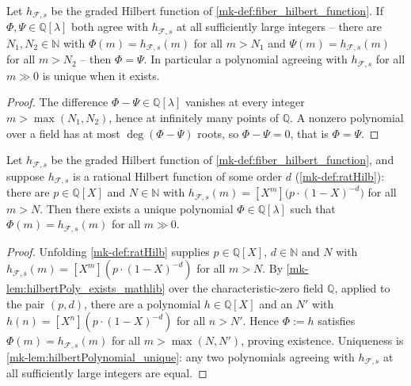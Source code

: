 \begin{lemma}\label{mk-lem:hilbertPolynomial_unique}
  \leanok

  Let \(h_{\mathcal{F},s}\) be the graded Hilbert function of
  \ref{mk-def:fiber_hilbert_function}. If \(\Phi, \Psi \in \mathbb{Q}[\lambda]\)
  both agree with \(h_{\mathcal{F},s}\) at all sufficiently large integers --
  there are \(N_1, N_2 \in \mathbb{N}\) with
  \(\Phi(m) = h_{\mathcal{F},s}(m)\) for all \(m > N_1\) and
  \(\Psi(m) = h_{\mathcal{F},s}(m)\) for all \(m > N_2\) -- then
  \(\Phi = \Psi\). In particular a polynomial agreeing with
  \(h_{\mathcal{F},s}\) for all \(m \gg 0\) is unique when it exists.
\end{lemma}

\begin{proof}
  \leanok
  The difference \(\Phi - \Psi \in \mathbb{Q}[\lambda]\) vanishes at every
  integer \(m > \max(N_1, N_2)\), hence at infinitely many points of
  \(\mathbb{Q}\). A nonzero polynomial over a field has at most
  \(\deg(\Phi - \Psi)\) roots, so \(\Phi - \Psi = 0\), that is
  \(\Phi = \Psi\).
\end{proof}

\begin{lemma}\label{mk-lem:hilbertPoly_of_isRatHilb}
  \leanok

  Let \(h_{\mathcal{F},s}\) be the graded Hilbert function of
  \ref{mk-def:fiber_hilbert_function}, and suppose \(h_{\mathcal{F},s}\) is a
  rational Hilbert function of some order \(d\) (\ref{mk-def:ratHilb}): there
  are \(p \in \mathbb{Q}[X]\) and \(N \in \mathbb{N}\) with
  \(h_{\mathcal{F},s}(m) = [X^m]\bigl(p \cdot (1-X)^{-d}\bigr)\) for all
  \(m > N\). Then there exists a unique polynomial
  \(\Phi \in \mathbb{Q}[\lambda]\) such that
  \(\Phi(m) = h_{\mathcal{F},s}(m)\) for all \(m \gg 0\).
\end{lemma}

\begin{proof}
  \leanok
  Unfolding \ref{mk-def:ratHilb} supplies \(p \in \mathbb{Q}[X]\),
  \(d \in \mathbb{N}\) and \(N\) with
  \(h_{\mathcal{F},s}(m) = [X^m](p\cdot(1-X)^{-d})\) for all \(m > N\). By
  \ref{mk-lem:hilbertPoly_exists_mathlib} over the characteristic-zero field
  \(\mathbb{Q}\), applied to the pair \((p, d)\), there are a polynomial
  \(h \in \mathbb{Q}[X]\) and an \(N'\) with
  \(h(n) = [X^n](p\cdot(1-X)^{-d})\) for all \(n > N'\). Hence
  \(\Phi := h\) satisfies \(\Phi(m) = h_{\mathcal{F},s}(m)\) for all
  \(m > \max(N, N')\), proving existence. Uniqueness is
  \ref{mk-lem:hilbertPolynomial_unique}: any two polynomials agreeing with
  \(h_{\mathcal{F},s}\) at all sufficiently large integers are equal.
\end{proof}

